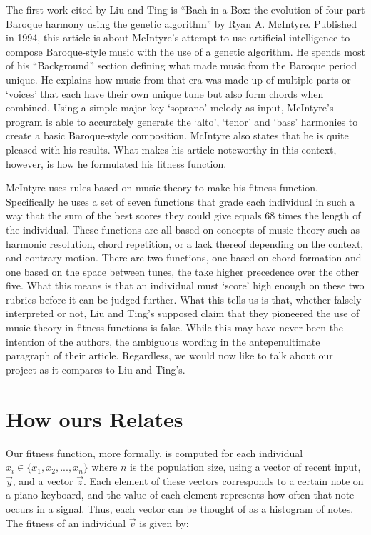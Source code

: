\documentclass[conference]{IEEEtran}
\begin{document}
The first work cited by Liu and Ting is “Bach in a Box: the evolution of four part Baroque harmony using the genetic algorithm” by Ryan A. McIntyre\cite{b2}.  Published in 1994, this article is about McIntyre’s attempt to use artificial intelligence to compose Baroque-style music with the use of a genetic algorithm.  He spends most of his “Background” section defining what made music from the Baroque period unique.  He explains how music from that era was made up of multiple parts or ‘voices’ that each have their own unique tune but also form chords when combined.  Using a simple major-key ‘soprano’ melody as input, McIntyre’s program is able to accurately generate the ‘alto’, ‘tenor’ and ‘bass’ harmonies to create a basic Baroque-style composition. McIntyre also states that he is quite pleased with his results\cite{b2}.  What makes his article noteworthy in this context, however, is how he formulated his fitness function.

McIntyre uses rules based on music theory to make his fitness function.  Specifically he uses a set of seven functions that grade each individual in such a way that the sum of the best scores they could give equals 68 times the length of the individual.  These functions are all based on concepts of music theory such as harmonic resolution, chord repetition, or a lack thereof depending on the context, and contrary motion.  There are two functions, one based on chord formation and one based on the space between tunes, the take higher precedence over the other five.  What this means is that an individual must ‘score’ high enough on these two rubrics before it can be judged further\cite{b2}.  What this tells us is that, whether falsely interpreted or not, Liu and Ting’s supposed claim that they pioneered the use of music theory in fitness functions is false.  While this may have never been the intention of the authors, the ambiguous wording in the antepenultimate paragraph of their article.  Regardless, we would now like to talk about our project as it compares to Liu and Ting’s.


\section{How ours Relates}

Our fitness function, more formally, is computed for each individual
$x_{i} \in \{x_{1},x_{2},...,x_{n}\} $ where $n$ is the population size, using 
a vector of recent input, $\vec{y}$, and a vector $\vec{z}$. Each element of these 
vectors corresponds to a certain note on a piano keyboard, and the value of
each element represents how often that note occurs in a signal. Thus, each vector
can be thought of as a histogram of notes. The fitness of an individual $\vec{v}$ is given by:
\end{document}
